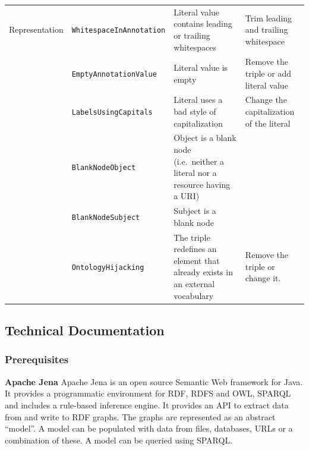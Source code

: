 \begin{table}[t]
\begin{center}
\begin{tabular}{p{}p{}p{}p{}}
Representation & \texttt{WhitespaceInAnnotation}         & Literal value contains leading or trailing whitespaces               & Trim leading and trailing whitespace                                                  \\
               & \texttt{EmptyAnnotationValue}           & Literal value is empty                                               & Remove the triple or add literal value                                                \\
               & \texttt{LabelsUsingCapitals}            & Literal uses a bad style of capitalization                           & Change the capitalization of the literal                                              \\
               & \texttt{BlankNodeObject}                & Object is a blank node (i.e.\ neither a literal nor a resource having a URI) &                                                                                       \\
               & \texttt{BlankNodeSubject}               & Subject is a blank node           &                                                                                       \\
               & \texttt{OntologyHijacking}              & The triple redefines an element that already exists in an external vocabulary                              & Remove the triple or change it.
\end{tabular}
\end{center}
\end{table}

\subsection{Technical Documentation}


\subsubsection{Prerequisites}

\textbf{Apache Jena}
\label{sec:Jena}
Apache Jena
is an open source Semantic Web framework for Java. 
It provides a programmatic environment for RDF, RDFS and OWL, SPARQL and includes a rule-based inference engine. 
It provides an API to extract data from and write to RDF graphs. The graphs are represented as an abstract ``model''.  A model can be populated with data from files, databases, URLs or a combination of these. A model can be queried using SPARQL.

